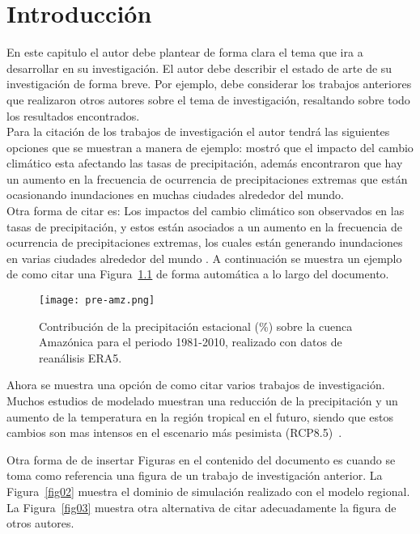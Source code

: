 \chapter{Introducción}
\label{cap1}

En este capitulo el autor debe plantear de forma clara el tema que ira a desarrollar en su investigación. El autor debe describir el estado de arte de su investigación de forma breve. Por ejemplo, debe considerar los trabajos anteriores que realizaron otros autores sobre el tema de investigación, resaltando sobre todo los resultados encontrados.\\

Para la citación de los trabajos de investigación el autor tendrá las siguientes opciones que se muestran a manera de ejemplo: \cite{tabari2020} mostró que el impacto del cambio climático esta afectando las tasas de precipitación, además encontraron que hay un aumento en la frecuencia de ocurrencia de precipitaciones extremas que están ocasionando inundaciones en muchas ciudades alrededor del mundo.\\ 

Otra forma de citar es: Los impactos del cambio climático son observados en las tasas de precipitación, y estos están asociados a un aumento en la frecuencia de ocurrencia de precipitaciones extremas, los cuales están generando inundaciones en varias ciudades alrededor del mundo \citep{tabari2020}. A continuación se muestra un ejemplo de como citar una Figura~\ref{fig01} de forma automática a lo largo del documento.\\

\begin{figure}[!ht]
\centering
\texttt{[image: pre-amz.png]}
\caption{Contribución de la precipitación estacional (\%) sobre la cuenca Amazónica para el periodo 1981-2010, realizado con datos de reanálisis ERA5.}
\label{fig01}
\end{figure}


Ahora se muestra una opción de como citar varios trabajos de investigación. Muchos estudios de modelado muestran una reducción de la precipitación y un aumento de la temperatura en la región tropical en el futuro, siendo que estos cambios son mas intensos en el escenario más pesimista (RCP8.5)~\citep{reboita14,reboita21,blazquez20,llopart20}.

Otra forma de de insertar Figuras en el contenido del documento es cuando se toma como referencia una figura de un trabajo de investigación anterior. La Figura~\ref{fig02} muestra el dominio de simulación realizado con el modelo regional. La Figura~\ref{fig03} muestra otra alternativa de citar adecuadamente la figura de otros autores. 

